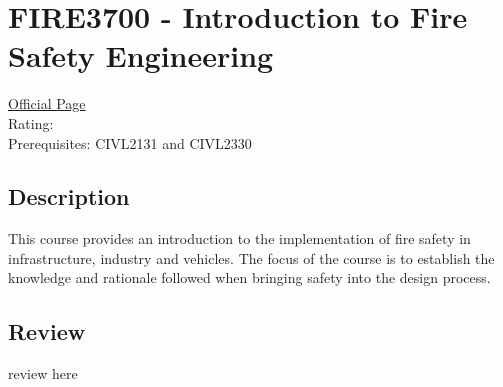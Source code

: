 \hypertarget{FIRE3700}{\section{FIRE3700 - Introduction to Fire Safety Engineering}}

\large
\textcolor{turbo_purple}{\href{https://my.uq.edu.au/programs-courses/course.html?course_code=FIRE3700}{Official Page}} \\
Rating: \cstar\cstar\cstar\cstar\ostar \\
Prerequisites: CIVL2131 and CIVL2330

\normalsize
\subsection*{Description}
This course provides an introduction to the implementation of fire safety in infrastructure, industry and vehicles.
The focus of the course is to establish the knowledge and rationale followed when bringing safety into the design process.

\subsection*{Review}
review here
